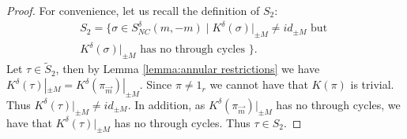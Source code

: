 \documentclass[11pt]{amsart}
\theoremstyle{definition}
\numberwithin{theorem}{section}
\newcommand{\sM}{{\scriptscriptstyle M}}
\newcommand{\NC}{\mathit{NC}}
\newcommand{\vm}{{\vec{m}}}
\newcommand{\id}{\mathit{id}}
\begin{document}
\begin{proof}
For convenience, let us recall the definition of $S_2$:
\begin{multline*}
S_2 = \{ \sigma \in S_\NC^\delta(m, -m) \mid
K^\delta(\sigma)|_{\pm M} \not= \id_{\pm M} \mbox{\ but\ }
\\ K^\delta(\sigma)|_{\pm M} \mbox{\ has no through
  cycles\ }\}.
\end{multline*}
Let $\tau \in \tilde S_2$, then by Lemma \ref{lemma:annular
  restrictions} we have $K^\delta(\tau)|_{\pm \sM} =
K^\delta(\pi_\vm)|_{\pm \sM}$. Since $\pi \not = 1_r$ we
cannot have that $K(\pi)$ is trivial. Thus
$K^\delta(\tau)|_{\pm \sM} \not = \id_{\pm\sM}$. In
addition, as $K^\delta(\pi_\vm)|_{\pm \sM}$ has no through
cycles, we have that $K^\delta(\tau)|_{\pm \sM}$ has no
through cycles. Thus $\tau \in S_2$.



\end{proof}
\end{document}
